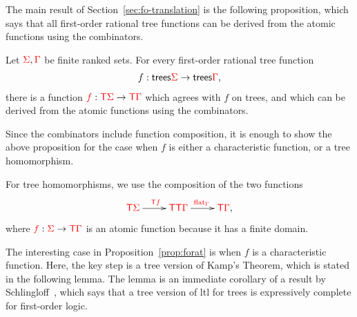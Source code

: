 The main  result of Section~\ref{sec:fo-translation} is the following proposition, which says  that all first-order rational tree functions can be derived from the atomic functions using the combinators. 
\begin{proposition} \label{prop:forat}    
    Let ${\color{red}{\Sigma}},{\color{red}{\Gamma}}$ be finite ranked sets. 
    For every  first-order rational tree function 
    \begin{align*}
        f : \mathsf {trees} {\color{red}{\Sigma}} \to \mathsf {trees} {\color{red}{\Gamma}},
    \end{align*}
    there is a function ${\color{red}{f}} : {\color{red}{\mathsf T}} {\color{red}{\Sigma}} \to {\color{red}{\mathsf T}} {\color{red}{\Gamma}}$ which agrees with $f$ on trees, and which can be derived from the atomic functions using the combinators. 
\end{proposition}       
Since the combinators include function composition, it is enough to show the above proposition for the case when $f$ is either a characteristic function, or a tree homomorphism. 

For tree homomorphisms, we use the composition of the two functions
\begin{align*}
    \xymatrix{
        \tmonad \rSigma \ar[r]^{\tmonad \ranked f} & \tmonad \tmonad \rGamma \ar[r]^{\flatt_\rGamma} & \tmonad \rGamma,
    }
\end{align*}
where ${\color{red}{f}} : {\color{red}{\Sigma}} \to {\color{red}{\mathsf T}} {\color{red}{\Gamma}}$ is an atomic function because it has a finite domain.  

The interesting case in Proposition~\ref{prop:forat} is when $f$ is a characteristic function. Here, the key step is a tree version of Kamp's Theorem, which is stated in the following lemma. The lemma is an immediate corollary of a result by Schlingloff~\cite[Theorem 2.6]{schlingloff1992expressive}, which says that a tree version of {\sc ltl} for trees is expressively complete for first-order logic.  


